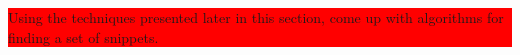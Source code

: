 \colorbox{red}{\parbox{\textwidth}{
\begin{exercise}
Using the techniques presented later in this section, come up with
algorithms for finding a set of snippets.  
\end{exercise}
}}

